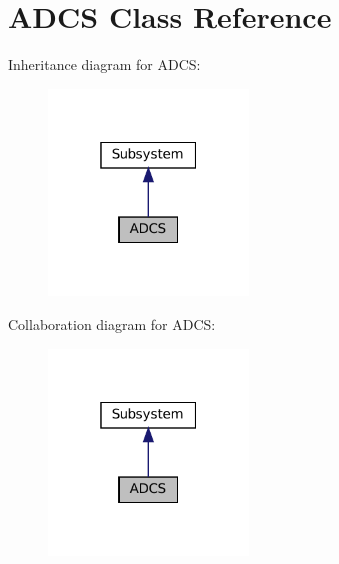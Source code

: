 \hypertarget{class_a_d_c_s}{}\section{A\+D\+CS Class Reference}
\label{class_a_d_c_s}


Inheritance diagram for A\+D\+CS\+:\nopagebreak
\begin{figure}[H]
\begin{center}
\leavevmode
\includegraphics[width=151pt]{class_a_d_c_s__inherit__graph}
\end{center}
\end{figure}


Collaboration diagram for A\+D\+CS\+:\nopagebreak
\begin{figure}[H]
\begin{center}
\leavevmode
\includegraphics[width=151pt]{class_a_d_c_s__coll__graph}
\end{center}
\end{figure}
